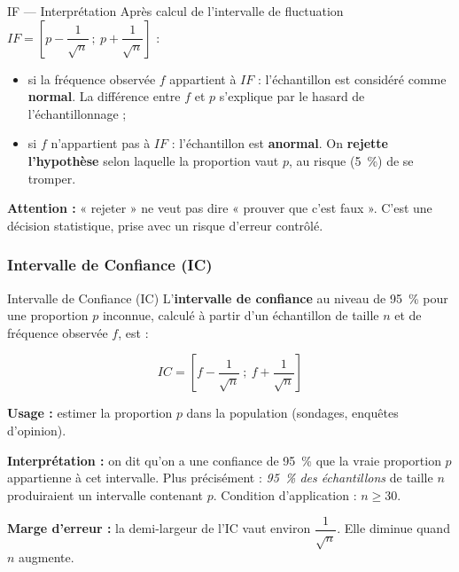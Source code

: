 \documentclass[11pt,a4paper]{article}
\newcommand{\IF}{\textit{IF}}
\newcommand{\IC}{\textit{IC}}
\begin{document}
	\begin{ficheoutils}{IF — Interprétation}
		Après calcul de l'intervalle de fluctuation
		$\IF{} = \left[p - \dfrac{1}{\sqrt{n}}\ ;\ p + \dfrac{1}{\sqrt{n}}\right]$ :
		\begin{itemize}
			\item si la fréquence observée $f$ appartient à $\IF{}$ : l'échantillon est
			considéré comme \textbf{normal}. La différence entre $f$ et $p$ s'explique
			par le hasard de l'échantillonnage ;
			\item si $f$ n'appartient pas à $\IF{}$ : l'échantillon est
			\textbf{anormal}. On \textbf{rejette l'hypothèse} selon laquelle la
			proportion vaut $p$, au risque (5~\%) de se tromper.
		\end{itemize}
		\begin{notebox}
			\textbf{Attention :} « rejeter » ne veut pas dire « prouver que c'est faux ».
			C'est une décision statistique, prise avec un risque d'erreur contrôlé.
		\end{notebox}
	\end{ficheoutils}
	
	\subsubsection{Intervalle de Confiance (IC)}
	
	\begin{ficheoutils}{Intervalle de Confiance (IC)}
		L'\textbf{intervalle de confiance} au niveau de 95~\% pour une proportion $p$
		inconnue, calculé à partir d'un échantillon de taille $n$ et de fréquence
		observée $f$, est :
		\begin{formule}
			\[ \IC{} = \left[f - \dfrac{1}{\sqrt{n}}\ ;\ f + \dfrac{1}{\sqrt{n}}\right] \]
		\end{formule}
		\textbf{Usage :} estimer la proportion $p$ dans la population (sondages,
		enquêtes d'opinion).
		\begin{notebox}
			\textbf{Interprétation :} on dit qu'on a une confiance de 95~\% que la vraie
			proportion $p$ appartienne à cet intervalle. Plus précisément : \emph{95~\% des
				échantillons} de taille $n$ produiraient un intervalle contenant $p$.
			Condition d'application : $n \geq 30$.
		\end{notebox}
		\textbf{Marge d'erreur :} la demi-largeur de l'IC vaut environ
		$\dfrac{1}{\sqrt{n}}$. Elle diminue quand $n$ augmente.
	\end{ficheoutils}
	
\end{document}
